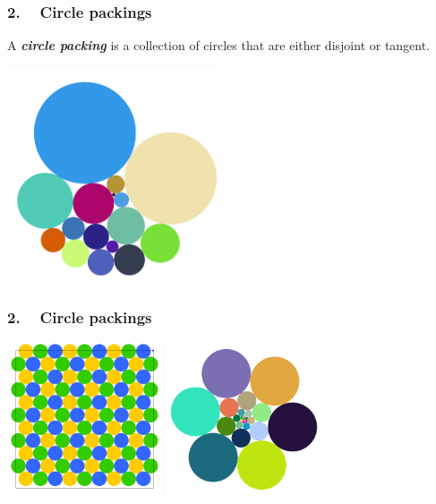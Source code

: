 
\begin{frame}
\frametitle{2. ~ Circle packings}

A \emph{\bfseries circle packing} is a collection of circles that are either disjoint or tangent.


\begin{center}
 \includegraphics[width=180pt]{images/CP1.png}
\end{center}



\end{frame}




\begin{frame}
\frametitle{2. ~ Circle packings}


\begin{center}
\includegraphics[width=130pt]{images/CP5.png} \hspace{30pt}
\includegraphics[width=130pt]{images/CP7.png}
\end{center}

\end{frame}






